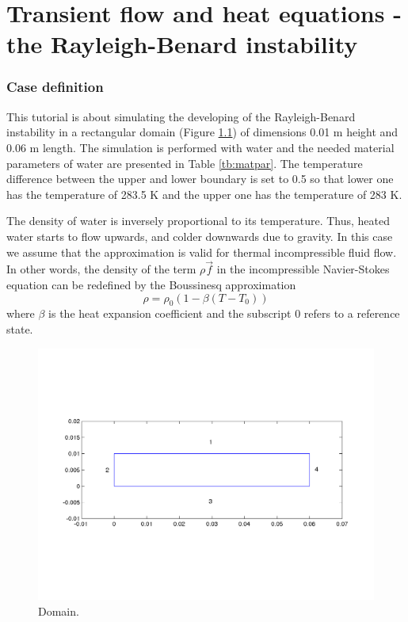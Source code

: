 \chapter{Transient flow and heat equations - the Rayleigh-Benard instability}


\subsection*{Case definition}
\begin{flushleft}
This tutorial is about simulating the developing of the Rayleigh-Benard instability in a rectangular domain 
(Figure \ref{fg:rb_geometry}) of dimensions 0.01 m height and 0.06 m length. The simulation is performed with water and the needed material parameters of water are presented in Table \ref{tb:matpar}. The temperature difference between the upper and lower boundary is set to 0.5 so that lower one has the temperature of  283.5 K and the upper one has the temperature of 283 K.



The density of water is inversely proportional to its temperature. Thus, heated water starts to flow upwards, and colder downwards due to gravity. 
In this case we assume that the  approximation is valid for thermal incompressible fluid flow. In other words, the density of the term $\rho$$\vec{f}$ in the incompressible Navier-Stokes equation can be redefined by the Boussinesq approximation
\begin{displaymath}
\rho = {\rho}_0(1-\beta(T-{T}_0))
\end{displaymath}
where $\beta$ is the heat expansion coefficient and the subscript 0 refers to a reference state.


\begin{figure}[h]
\centering
\includegraphics[width=150 mm, height=55 mm]{rb_geometry}
\caption{Domain.}\label{fg:rb_geometry}
\end{figure}  



\end{flushleft}
